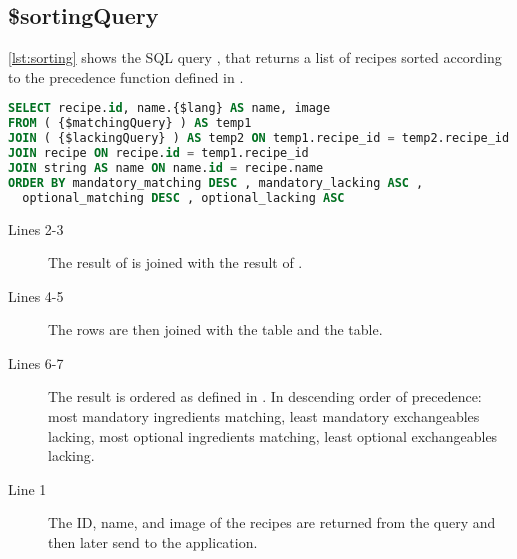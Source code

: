 \subsection*{\$sortingQuery}
\autoref{lst:sorting} shows the SQL query , that returns a list of recipes sorted according to the precedence function defined in .
\begin{lstlisting}[language=SQL, float=h, label={lst:sorting}, caption={\$sortingQuery, combine and sort.}]
SELECT recipe.id, name.{$lang} AS name, image
FROM ( {$matchingQuery} ) AS temp1
JOIN ( {$lackingQuery} ) AS temp2 ON temp1.recipe_id = temp2.recipe_id
JOIN recipe ON recipe.id = temp1.recipe_id
JOIN string AS name ON name.id = recipe.name
ORDER BY mandatory_matching DESC , mandatory_lacking ASC ,
  optional_matching DESC , optional_lacking ASC
\end{lstlisting}
\begin{description}
\item[Lines 2-3] The result of  is joined with the result of .
\item[Lines 4-5] The rows are then joined with the  table and the  table. 
\item[Lines 6-7] The result is ordered as defined in . In descending order of precedence: most mandatory ingredients matching, least mandatory exchangeables lacking, most optional ingredients matching, least optional exchangeables lacking.
\item[Line 1] The ID, name, and image of the recipes are returned from the query and then later send to the application.
\end{description}





